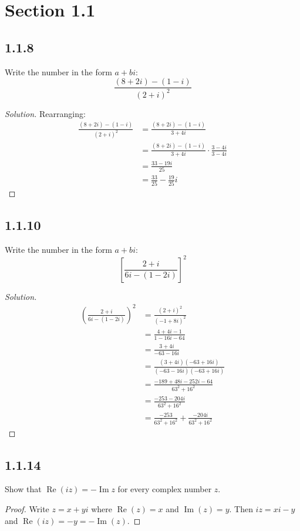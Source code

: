 \documentclass{article}
\newenvironment{solution}{
\begin{proof}[Solution]}{
\end{proof}}
\begin{document}
\section*{Section 1.1}

\subsection*{1.1.8}
Write the number in the form $a + bi$:
\[
  \frac{(8+2i)-(1-i)}{(2+i)^2}
\]
\begin{solution}
  Rearranging:
  \begin{align*}
    \frac{(8+2i)-(1-i)}{(2+i)^2}
      &= \frac{(8+2i)-(1-i)}{3+4i} \\
      &= \frac{(8+2i)-(1-i)}{3+4i} \cdot \frac{3-4i}{3-4i} \\
      &= \frac{33-19i}{25} \\
      &= \frac{33}{25} - \frac{19}{25}i
  \end{align*}
\end{solution}

\subsection*{1.1.10}
Write the number in the form $a + bi$:
\[
  \left[\frac{2+i}{6i-(1-2i)}\right]^2
\]
\begin{solution}
  \begin{align*}
    \left(\frac{2+i}{6i-(1-2i)}\right)^2
      &= \frac{(2+i)^2}{(-1+8i)^2} \\
      &= \frac{4+4i-1}{1-16i-64} \\
      &= \frac{3+4i}{-63-16i} \\
      &= \frac{(3+4i)(-63+16i)}{(-63-16i)(-63+16i)} \\
      &= \frac{-189+48i-252i-64}{63^2+16^2} \\
      &= \frac{-253-204i}{63^2+16^2} \\
      &= \frac{-253}{63^2+16^2} + \frac{-204i}{63^2+16^2}
  \end{align*}
\end{solution}

\subsection*{1.1.14}
Show that $\operatorname{Re}(iz) = -\operatorname{Im} z$ for every complex number $z$.
\begin{proof}
  Write $z = x + yi$ where $\operatorname{Re}(z) = x$ and $\operatorname{Im}(z) = y$.
  Then $iz = xi - y$ and $\operatorname{Re}(iz) = -y = -\operatorname{Im}(z)$.
\end{proof}
\end{document}
